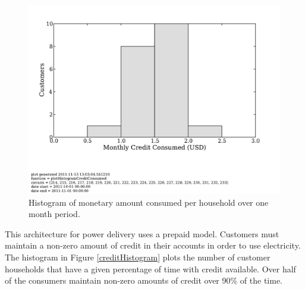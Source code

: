 \documentclass{sig-alternate}
\begin{document}
\begin{figure}[]
\begin{center}
\includegraphics[trim = 0in 1.3in 0in 0in, clip, width=\columnwidth]
                {figures/consumptionHistogram.pdf}
\end{center}
\caption{Histogram of monetary amount consumed per household over one month period.}
\label{consumptionHistogram}
\end{figure}


This architecture for power delivery uses a prepaid model.
Customers must maintain a non-zero amount of credit in their accounts in order
to use electricity.
The histogram in Figure \ref{creditHistogram} plots the number of customer households
that have a given percentage of time with credit available.
Over half of the consumers maintain non-zero amounts of credit over 90\% of
the time.
\end{document}
